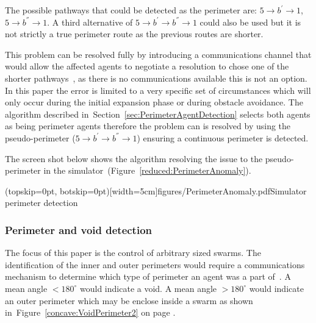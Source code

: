\documentclass{ieeeaccess}
\begin{document}
The possible pathways that could be detected as the perimeter are: $5 \rightarrow b^{'} \rightarrow 1$, $5 \rightarrow b^{''} \rightarrow 1$. A third alternative of $5 \rightarrow b^{'} \rightarrow b^{''} \rightarrow 1$ could also be used but it is not strictly a true perimeter route as the previous routes are shorter.  

This problem can be resolved fully by introducing a communications channel that would allow the affected agents to negotiate a resolution to chose one of the shorter pathways~\cite{MD:09}, as there is no communications available this is not an option. In this paper the error is limited to a very specific set of circumstances which will only occur during the initial expansion phase or during obstacle avoidance. The algorithm described in~Section~\ref{sec:PerimeterAgentDetection} selects both agents as being perimeter agents therefore the problem can is resolved by using the pseudo-perimeter ($5 \rightarrow b^{'} \rightarrow b^{''} \rightarrow 1$) ensuring a continuous perimeter is detected. 

The screen shot below shows the algorithm resolving the issue to the pseudo-perimeter in the simulator~(Figure~\ref{reduced:PerimeterAnomaly}).


\Figure[t!](topskip=0pt, botskip=0pt)[width=5cm]{figures/PerimeterAnomaly.pdf}{Simulator perimeter detection\label{reduced:PerimeterAnomaly}}

\subsubsection{Perimeter and void detection}\label{sec:PerimeterVoidDetection} 
The focus of this paper is the control of arbitrary sized swarms. The identification of the inner and outer perimeters would require a communications mechanism to determine which type of perimeter an agent was a part of~\cite{ZAPS:07,MD:09}. A mean angle $< 180^\circ$ would indicate a void. A mean angle $> 180^\circ$ would indicate an outer perimeter which may be enclose inside a swarm as shown in~Figure~\ref{concave:VoidPerimeter2} on page \pageref{concave:VoidPerimeter2}.  
\end{document}
